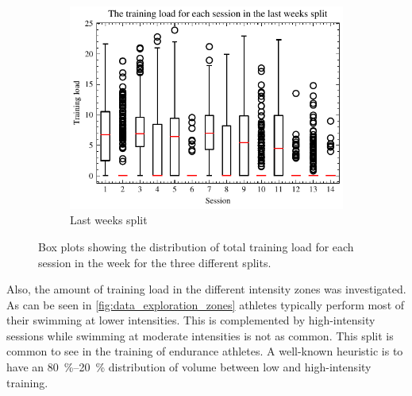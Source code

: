 \begin{figure}[ht]
    \begin{subfigure}[t]{0.48\textwidth}
        \centering
        \includegraphics[width=\textwidth]{chapters/figures/data_exploration/last_weeks_session_boxplot.pdf}
        \captionsetup{width=.9\linewidth}
        \caption{Last weeks split}
    \end{subfigure}
    \caption{Box plots showing the distribution of total training load for each session in the week for the three different splits.}
    \label{fig:data_exploration_distribution}
\end{figure}

Also, the amount of training load in the different intensity zones was investigated.
As can be seen in \cref{fig:data_exploration_zones} athletes typically perform most of their swimming at lower intensities.
This is complemented by high-intensity sessions while swimming at moderate intensities is not as common.
This split is common to see in the training of endurance athletes.
A well-known heuristic is to have an \SIrange{80}{20}{\percent} distribution of volume between low and high-intensity training.

